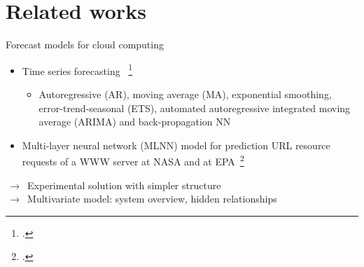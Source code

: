 \documentclass{beamer}
\begin{document}
\section{Related works}
\begin{frame}{Forecast models for cloud computing}
	\begin{itemize}
			\item{
				Time series forecasting ~\footcite{Hipel et al. 1994}
				}
				\begin{itemize}
					\item {
						Autoregressive (AR), moving average (MA), exponential smoothing, error-trend-seasonal (ETS), automated autoregressive integrated moving average (ARIMA) and back-propagation NN  
					}
				\end{itemize}	

			\item {
	 			Multi-layer neural network (MLNN) model for prediction URL resource requests of a WWW server at NASA and at EPA~\footcite{Prevost et al. 2011}  
			}
	\end{itemize}
	\vspace{0.3cm}
		$\,\to\,$ Experimental solution with simpler structure\\
		$\,\to\,$ Multivariate model: system overview, hidden relationships

\end{frame}
\end{document}
